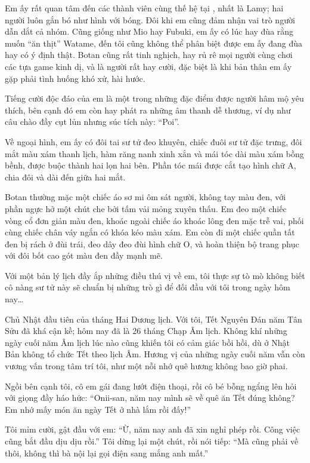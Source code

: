 \documentclass[../main.tex]{subfiles}
\begin{document}
Em ấy rất quan tâm đến các thành viên cùng thế hệ tại \hll, nhất là Lamy; hai người luôn gắn bó như hình với bóng. Đôi khi em cũng đảm nhận vai trò người dẫn dắt cả nhóm. Cũng giống như Mio hay Fubuki, em ấy có lúc hay đùa rằng muốn ``ăn thịt'' Watame, đến tôi cũng không thể phân biệt được em ấy đang đùa hay có ý định thật. Botan cũng rất tinh nghịch, hay rủ rê mọi người cùng chơi các tựa game kinh dị, và là người rất hay cười, đặc biệt là khi bản thân em ấy gặp phải tình huống khó xử, hài hước.

Tiếng cười độc đáo của em là một trong những đặc điểm được người hâm mộ yêu thích, bên cạnh đó em còn hay phát ra những âm thanh dễ thương, ví dụ như câu chào đầy cụt lủn nhưng súc tích này: ``Poi''.

Về ngoại hình, em ấy có đôi tai sư tử đeo khuyên, chiếc đuôi sư tử đặc trưng, đôi mắt màu xám thanh lịch, hàm răng nanh xinh xắn và mái tóc dài màu xám bồng bềnh, được buộc thành hai lọn hai bên. Phần tóc mái được cắt tạo hình chữ A, chia đôi và dài đến giữa hai mắt.

Botan thường mặc một chiếc áo sơ mi ôm sát người, không tay màu đen, với phần ngực hở một chút che bởi tấm vải mỏng xuyên thấu. Em đeo một chiếc vòng cổ đơn giản màu đen, khoác ngoài chiếc áo khoác lông đen mặc trễ vai, phối cùng chiếc chân váy ngắn có khóa kéo màu xám. Em còn đi một chiếc quần tất đen bị rách ở đùi trái, đeo dây đeo đùi hình chữ O, và hoàn thiện bộ trang phục với đôi bốt cao gót màu đen đầy mạnh mẽ.

\chrint

Với một bản lý lịch đầy ắp những điều thú vị về em, tôi thực sự tò mò không biết cô nàng sư tử này sẽ chuẩn bị những trò gì để đối đầu với tôi trong ngày hôm nay\dots

\il

Chủ Nhật đầu tiên của tháng Hai Dương lịch. Với tôi, Tết Nguyên Đán năm Tân Sửu đã khá cận kề; hôm nay đã là 26 tháng Chạp Âm lịch. Không khí những ngày cuối năm Âm lịch lúc nào cũng khiến tôi có cảm giác bồi hồi, dù ở Nhật Bản không tổ chức Tết theo lịch Âm. Hương vị của những ngày cuối năm vẫn còn vương vấn trong tâm trí tôi, như một nỗi nhớ quê hương không bao giờ phai.

Ngồi bên cạnh tôi, cô em gái đang lướt điện thoại, rồi cô bé bỗng ngẩng lên hỏi với giọng đầy háo hức: ``Onii-san, năm nay mình sẽ về quê ăn Tết đúng không? Em nhớ mấy món ăn ngày Tết ở nhà lắm rồi đấy!''

Tôi mỉm cười, gật đầu với em: ``Ừ, năm nay anh đã xin nghỉ phép rồi. Công việc cũng bắt đầu dịu dịu rồi.'' Tôi dừng lại một chút, rồi nói tiếp: ``Mà cũng phải về thôi, không thì bà nội lại gọi điện sang mắng anh mất.''
\end{document}
